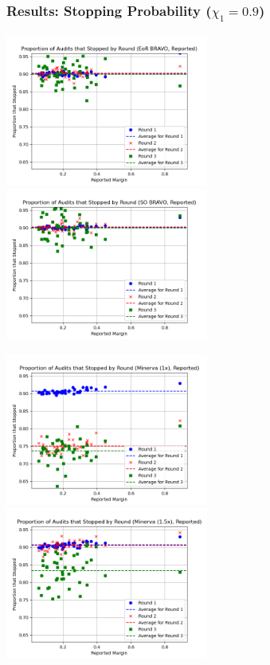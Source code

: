 \documentclass{beamer}
\begin{document}
\begin{frame}
\frametitle{Results: Stopping Probability ($\chi_1=0.9$)}
\pause 

\includegraphics[width=0.5\textwidth]{scale/eor.png}
\pause 
\includegraphics[width=0.5\textwidth]{scale/so.png}

\pause 
\includegraphics[width=0.5\textwidth]{scale/minerva1.png}
\pause 
\includegraphics[width=0.5\textwidth]{scale/minerva1p5.png}
\end{frame}
\end{document}

